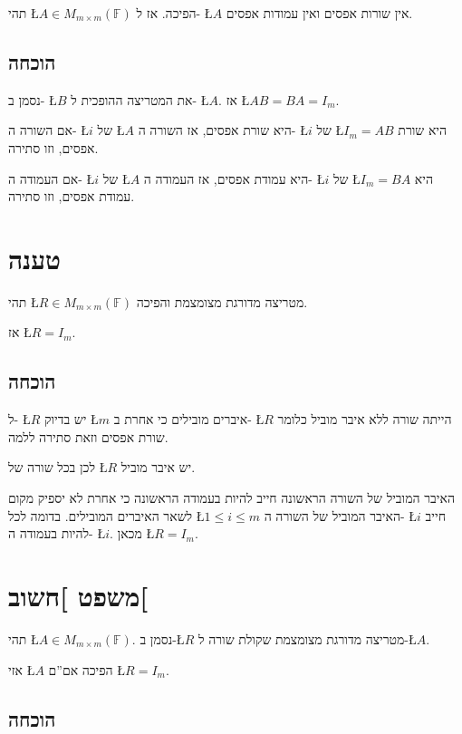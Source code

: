 \documentclass[english,hebrew]{article}
\begin{document}
תהי \L{$A\in M_{m\times m}(\mathbb{F})$} הפיכה. אז ל- \L{$A$} אין
שורות אפסים ואין עמודות אפסים.

\subsection{הוכחה}

נסמן ב- \L{$B$} את המטריצה ההופכית ל- \L{$A$}. אז \L{$AB=BA=I_{m}$}.

אם השורה ה- \L{$i$} של \L{$A$} היא שורת אפסים, אז השורה ה- \L{$i$}
של \L{$I_{m}=AB$} היא שורת אפסים, וזו סתירה.

אם העמודה ה- \L{$i$} של \L{$A$} היא עמודת אפסים, אז העמודה ה- \L{$i$}
של \L{$I_{m}=BA$} היא עמודת אפסים, וזו סתירה.

\section{טענה}

תהי \L{$R\in M_{m\times m}(\mathbb{F})$} מטריצה מדורגת מצומצמת והפיכה.

אז \L{$R=I_{m}$}.

\subsection{הוכחה}

ל- \L{$R$} יש בדיוק \L{$m$} איברים מובילים כי אחרת ב- \L{$R$} הייתה
שורה ללא איבר מוביל כלומר שורת אפסים וזאת סתירה ללמה.

לכן בכל שורה של \L{$R$} יש איבר מוביל.

האיבר המוביל של השורה הראשונה חייב להיות בעמודה הראשונה כי אחרת לא
יספיק מקום לשאר האיברים המובילים. בדומה לכל \L{$1\leq i\leq m$} האיבר
המוביל של השורה ה- \L{$i$} חייב להיות בעמודה ה- \L{$i$}. מכאן \L{$R=I_{m}$}.\\

\section{משפט {]}חשוב{[}}

תהי \L{$A\in M_{m\times m}(\mathbb{F})$}. נסמן ב-\L{$R$} מטריצה
מדורגת מצומצמת שקולת שורה ל-\L{$A$}. 

אזי \L{$A$} הפיכה אם\textquotedblright ם \L{$R=I_{m}$}.

\subsection{הוכחה}
\end{document}
